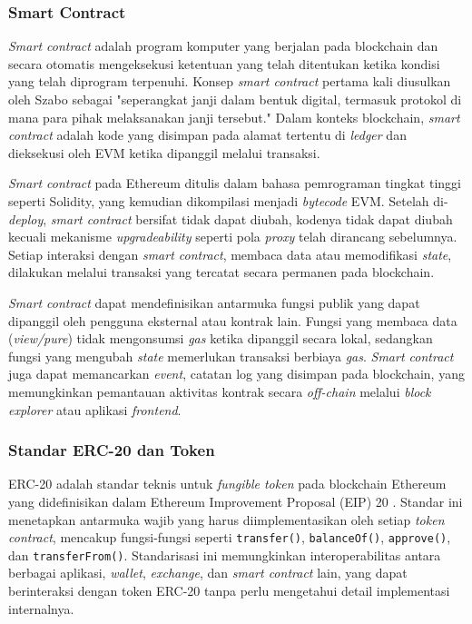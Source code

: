 \subsubsection{Smart Contract}

\textit{Smart contract} adalah program komputer yang berjalan pada blockchain dan secara otomatis mengeksekusi ketentuan yang telah ditentukan ketika kondisi yang telah diprogram terpenuhi. Konsep \textit{smart contract} pertama kali diusulkan oleh Szabo \cite{szabo1997smart} sebagai "seperangkat janji dalam bentuk digital, termasuk protokol di mana para pihak melaksanakan janji tersebut." Dalam konteks blockchain, \textit{smart contract} adalah kode yang disimpan pada alamat tertentu di \textit{ledger} dan dieksekusi oleh EVM ketika dipanggil melalui transaksi.

\textit{Smart contract} pada Ethereum ditulis dalam bahasa pemrograman tingkat tinggi seperti Solidity, yang kemudian dikompilasi menjadi \textit{bytecode} EVM. Setelah di-\textit{deploy}, \textit{smart contract} bersifat tidak dapat diubah, kodenya tidak dapat diubah kecuali mekanisme \textit{upgradeability} seperti pola \textit{proxy} telah dirancang sebelumnya. Setiap interaksi dengan \textit{smart contract}, membaca data atau memodifikasi \textit{state}, dilakukan melalui transaksi yang tercatat secara permanen pada blockchain.

\textit{Smart contract} dapat mendefinisikan antarmuka fungsi publik yang dapat dipanggil oleh pengguna eksternal atau kontrak lain. Fungsi yang membaca data (\textit{view/pure}) tidak mengonsumsi \textit{gas} ketika dipanggil secara lokal, sedangkan fungsi yang mengubah \textit{state} memerlukan transaksi berbiaya \textit{gas}. \textit{Smart contract} juga dapat memancarkan \textit{event}, catatan log yang disimpan pada blockchain, yang memungkinkan pemantauan aktivitas kontrak secara \textit{off-chain} melalui \textit{block explorer} atau aplikasi \textit{frontend}.

\subsubsection{Standar ERC-20 dan Token}

ERC-20 adalah standar teknis untuk \textit{fungible token} pada blockchain Ethereum yang didefinisikan dalam Ethereum Improvement Proposal (EIP) 20 \cite{eip20}. Standar ini menetapkan antarmuka wajib yang harus diimplementasikan oleh setiap \textit{token contract}, mencakup fungsi-fungsi seperti \texttt{transfer()}, \texttt{balanceOf()}, \texttt{approve()}, dan \texttt{transferFrom()}. Standarisasi ini memungkinkan interoperabilitas antara berbagai aplikasi, \textit{wallet}, \textit{exchange}, dan \textit{smart contract} lain, yang dapat berinteraksi dengan token ERC-20 tanpa perlu mengetahui detail implementasi internalnya.

